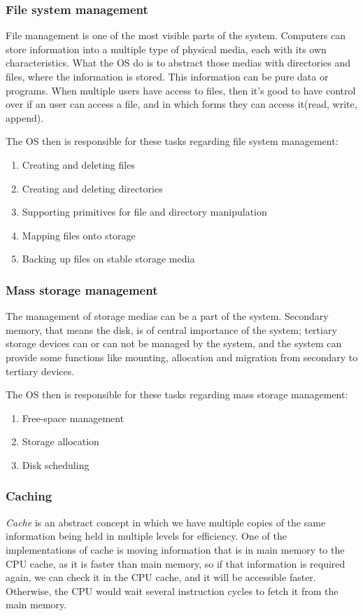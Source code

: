 \documentclass{article}
\begin{document}
\subsubsection{File system management}
File management is one of the most visible parts of the system. Computers can store information into a multiple type of physical media, each with its own characteristics. What the OS do is to abstract those medias with directories and files, where the information is stored. This information can be pure data or programs. When multiple users have access to files, then it's good to have control over if an user can access a file, and in which forms they can access it(read, write, append).

The OS then is responsible for these tasks regarding file system management:
\begin{enumerate}
  \item Creating and deleting files
  \item Creating and deleting directories
  \item Supporting primitives for file and directory manipulation
  \item Mapping files onto storage
  \item Backing up files on stable storage media
\end{enumerate}

\subsubsection{Mass storage management}
The management of storage medias can be a part of the system. Secondary memory, that means the disk, is of central importance of the system; tertiary storage devices can or can not be managed by the system, and the system can provide some functions like mounting, allocation and migration from secondary to tertiary devices.

The OS then is responsible for these tasks regarding mass storage management:
\begin{enumerate}
  \item Free-space management
  \item Storage allocation
  \item Disk scheduling
\end{enumerate}

\subsubsection{Caching}
\emph{Cache} is an abstract concept in which we have multiple copies of the same information being held in multiple levels for efficiency. One of the implementations of cache is moving information that is in main memory to the CPU cache, as it is faster than main memory, so if that information is required again, we can check it in the CPU cache, and it will be accessible faster. Otherwise, the CPU would wait several instruction cycles to fetch it from the main memory.
\end{document}
